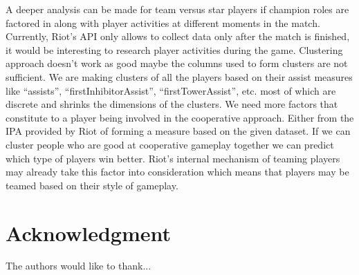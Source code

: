 \documentclass[conference]{IEEEtran}
\begin{document}
A deeper analysis can be made for team versus star players if champion roles are factored in along with player activities at different moments in the match. Currently, Riot's API only allows to collect data only after the match is finished, it would be interesting to research player activities during the game. Clustering approach doesn’t work as good maybe the columns used to form clusters are not sufficient. We are making clusters of all the players based on their assist measures like “assists”, “firstInhibitorAssist”, “firstTowerAssist”, etc. most of which are discrete and shrinks the dimensions of the clusters. We need more factors that constitute to a player being involved in the cooperative approach. Either from the IPA provided by Riot of forming a measure based on the given dataset. If we can cluster people who are good at cooperative gameplay together we can predict which type of players win better. Riot’s internal mechanism of teaming players may already take this factor into consideration which means that players may be teamed based on their style of gameplay. 

\section*{Acknowledgment}


The authors would like to thank...


\medskip
 

 
\end{document}
